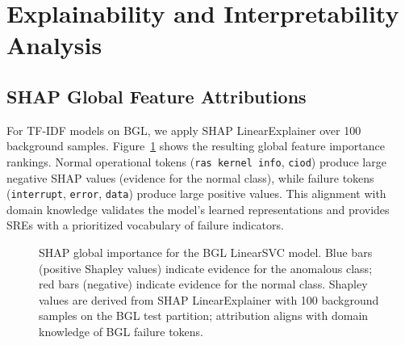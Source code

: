\documentclass{elektr}
\begin{document}
\section{Explainability and Interpretability Analysis}
\label{Sec:XAI}

\subsection{SHAP Global Feature Attributions}

For TF-IDF models on BGL, we apply SHAP LinearExplainer over 100 background
samples. Figure~\ref{fig:shap_summary} shows the resulting global feature importance rankings. Normal operational
tokens (\texttt{ras kernel info}, \texttt{ciod}) produce large negative SHAP values
(evidence for the normal class), while failure tokens (\texttt{interrupt},
\texttt{error}, \texttt{data}) produce large positive values. This alignment with
domain knowledge validates the model's learned representations and provides SREs
with a prioritized vocabulary of failure indicators.

\begin{figure}[h!]
\begin{center}
\caption{SHAP global importance for the BGL LinearSVC model. Blue bars (positive
Shapley values) indicate evidence for the anomalous class; red bars (negative)
indicate evidence for the normal class. Shapley values are derived from SHAP
LinearExplainer with 100 background samples on the BGL test partition;
attribution aligns with domain knowledge of BGL failure tokens.}
\label{fig:shap_summary}
\end{center}\vs{-4mm}
\end{figure}
\end{document}
